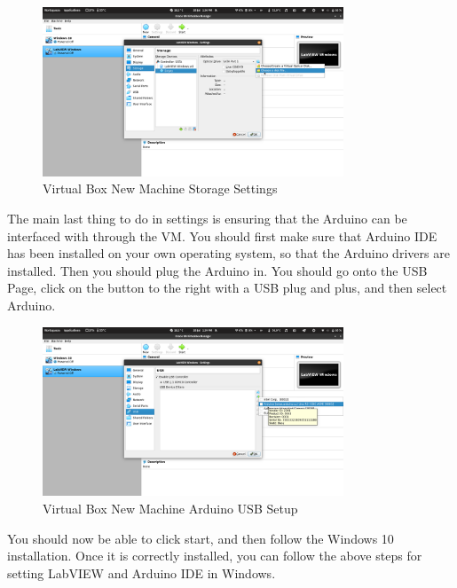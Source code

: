 \documentclass[a4paper,11pt]{report}
\begin{document}
\begin{figure}[H]
\centering
\includegraphics[width=0.8\textwidth]{screenshots/virtualboxstoragesettings}
\caption{Virtual Box New Machine Storage Settings}
\end{figure}

The main last thing to do in settings is ensuring that the Arduino can be interfaced with through the VM. You should first make sure that Arduino IDE has been installed on your own operating system, so that the Arduino drivers are installed. Then you should plug the Arduino in. You should go onto the USB Page, click on the button to the right with a USB plug and plus, and then select Arduino.

\begin{figure}[H]
\centering
\includegraphics[width=0.8\textwidth]{screenshots/virtualboxusbarduino}
\caption{Virtual Box New Machine Arduino USB Setup}
\end{figure}

You should now be able to click start, and then follow the Windows 10 installation. Once it is correctly installed, you can follow the above steps for setting LabVIEW and Arduino IDE in Windows.

\vspace*{1\baselineskip}

\printnoidxglossary[title={Electronics Glossary},sort=word]
\end{document}
